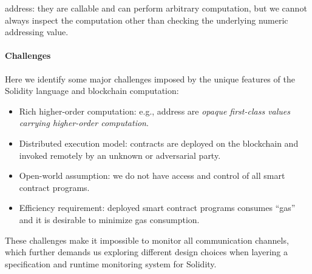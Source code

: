 



address: they are callable and can perform arbitrary computation, but we cannot always
inspect the computation other than checking the underlying numeric addressing value.







\paragraph{Challenges}
Here we identify some major challenges imposed by the unique features of the
Solidity language and blockchain computation:

\begin{itemize}
  \item Rich higher-order computation:
    e.g., address are \emph{opaque first-class values carrying higher-order
    computation}.
  \item Distributed execution model:
    contracts are deployed on the blockchain and invoked remotely by an unknown
    or adversarial party.
  \item Open-world assumption:
    we do not have access and control of all smart contract programs.
  \item Efficiency requirement:
    deployed smart contract programs consumes ``gas'' and it is desirable
    to minimize gas consumption.
\end{itemize}

These challenges make it impossible to monitor all communication channels,
which further demands us exploring different design choices when layering
a specification and runtime monitoring system for Solidity.


